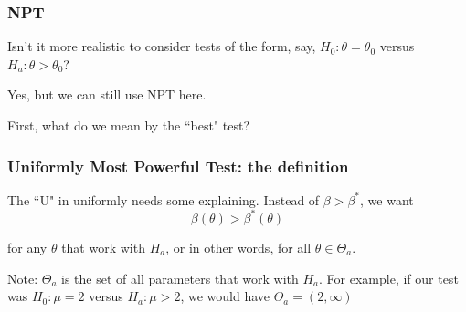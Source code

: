 \documentclass{beamer}
\begin{document}
\begin{frame}
\frametitle{NPT}

Isn't it more realistic to consider tests of the form, say, $H_0: \theta = \theta_0$ versus $H_a:\theta > \theta_0$?
\newline

Yes, but we can still use NPT here.
\newline

First, what do we mean by the ``best" test?
\newline

\end{frame}

\begin{frame}
\frametitle{Uniformly Most Powerful Test: the definition}

The ``U" in uniformly needs some explaining. Instead of $\beta > \beta^*$, we want
\[
\beta(\theta) > \beta^*(\theta)
\]

for any $\theta$ that work with $H_a$, or in other words, for all $\theta \in \Theta_a$.
\newline

Note: $\Theta_a$ is the set of all parameters that work with $H_a$. For example, if our test was $H_0:\mu = 2$ versus $H_a: \mu > 2$, we would have $\Theta_a = (2,\infty)$
\end{frame}
\end{document}
